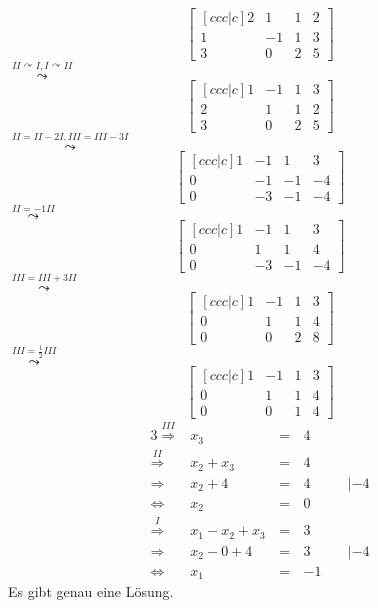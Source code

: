 \documentclass[10pt,a4paper,oneside,ngerman,numbers=noenddot]{scrartcl}
\begin{document}
\subsection{} %
\[
\begin{bmatrix}[ccc|c]
2 & 1 & 1 & 2 \\
1 & -1 & 1 & 3 \\
3 & 0 & 2 & 5
\end{bmatrix}
\]
$\overset{II \curvearrowright I, I \curvearrowright II}{\leadsto}$
\[
\begin{bmatrix}[ccc|c]
1 & -1 & 1 & 3 \\
2 & 1 & 1 & 2 \\
3 & 0 & 2 & 5
\end{bmatrix}
\]
$\overset{II = II - 2I, III = III - 3I}{\leadsto}$
\[
\begin{bmatrix}[ccc|c]
1 & -1 & 1 & 3 \\
0 & -1 & -1 & -4 \\
0 & -3 & -1 & -4
\end{bmatrix}
\]
$\overset{II = -1II}{\leadsto}$
\[
\begin{bmatrix}[ccc|c]
1 & -1 & 1 & 3 \\
0 & 1 & 1 & 4 \\
0 & -3 & -1 & -4
\end{bmatrix}
\]
$\overset{III = III + 3II}{\leadsto}$
\[
\begin{bmatrix}[ccc|c]
1 & -1 & 1 & 3 \\
0 & 1 & 1 & 4 \\
0 & 0 & 2 & 8
\end{bmatrix}
\]
$\overset{III = \frac{1}{2}III}{\leadsto}$
\[
\begin{bmatrix}[ccc|c]
1 & -1 & 1 & 3 \\
0 & 1 & 1 & 4 \\
0 & 0 & 1 & 4
\end{bmatrix}
\]
\begin{alignat*}{3}
\overset{III}{\Rightarrow} & x_{3} &\,=\,& 4 && \\
\overset{II}{\Rightarrow} & x_{2} + x_{3} &\,=\,& 4 && \\
\Rightarrow & x_{2} + 4 &\,=\,& 4 && \;| -4 \\
\Leftrightarrow & x_{2} &\,=\,& 0 & \\
\overset{I}{\Rightarrow} & x_{1} - x_{2} + x_{3} &\,=\,& 3 && \\
\Rightarrow & x_{2} - 0 + 4 &\,=\,& 3 && \;| -4 \\
\Leftrightarrow & x_{1} &\,=\,& -1 &&
\end{alignat*}
Es gibt genau eine Lösung.
\end{document}
